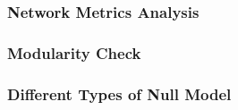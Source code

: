 \subsubsection*{Network Metrics Analysis}
%
\subsubsection*{Modularity Check}
\subsubsection*{Different Types of Null Model}

\clearpage